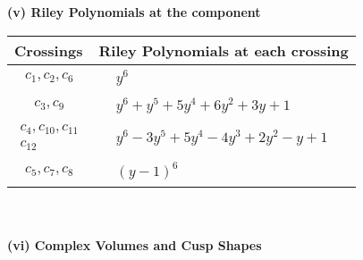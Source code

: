 \documentclass[1p]{elsarticle_modified}
\theoremstyle{definition}
\begin{document}
\newpage\renewcommand{\arraystretch}{1}
\flushleft \textbf{(v) Riley Polynomials at the component}\newline \\
\begin{tabular}{m{50pt}|m{274pt}}
Crossings & \hspace{64pt}Riley Polynomials at each crossing \\
\hline $$\begin{aligned}c_{1},c_{2},c_{6}\end{aligned}$$&$\begin{aligned}
&y^6
\end{aligned}$\\
\hline $$\begin{aligned}c_{3},c_{9}\end{aligned}$$&$\begin{aligned}
&y^6+y^5+5 y^4+6 y^2+3 y+1
\end{aligned}$\\
\hline $$\begin{aligned}c_{4},c_{10},c_{11}\\c_{12}\end{aligned}$$&$\begin{aligned}
&y^6-3 y^5+5 y^4-4 y^3+2 y^2- y+1
\end{aligned}$\\
\hline $$\begin{aligned}c_{5},c_{7},c_{8}\end{aligned}$$&$\begin{aligned}
&(y-1)^6
\end{aligned}$\\
\hline
\end{tabular}\\~\\
\newpage\flushleft \textbf{(vi) Complex Volumes and Cusp Shapes}
\end{document}
